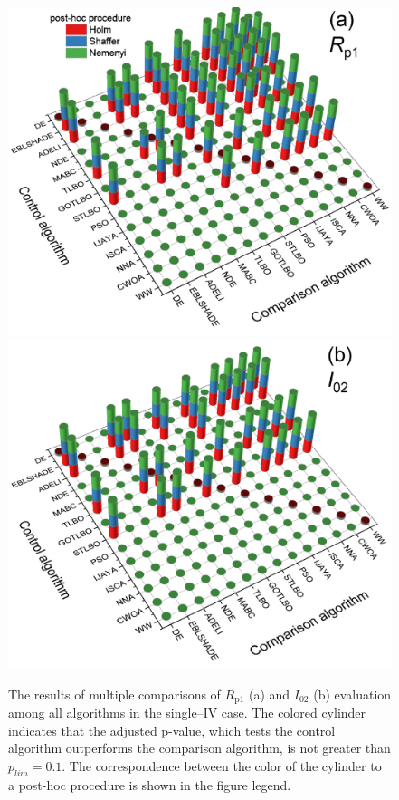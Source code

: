 \documentclass[a4paper,fleqn]{cas-dc}
\begin{document}
\begin{figure}[]
	\centering
		\includegraphics[width=.495\textwidth]{Rp1shot_NN}
        \includegraphics[width=.495\textwidth]{I02shot_NN}
	  \caption{The results of multiple comparisons of $R_\mathrm{p1}$ (a) and $I_{02}$ (b) evaluation
               among all algorithms in the single--IV case.
               The colored cylinder indicates that the adjusted p-value,
               which tests the control algorithm outperforms the comparison algorithm,
               is not greater than $p_{lim}=0.1$.
               The correspondence between the color of the cylinder to a post-hoc procedure is shown in the figure legend.
               }\label{figNNRezSingleIV}
\end{figure}

\end{document}
